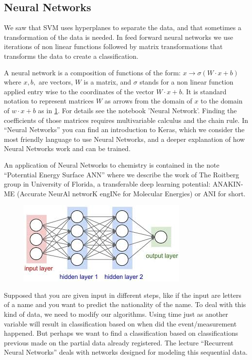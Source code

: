 \documentclass[11pt,letterpaper]{report}
\begin{document}
	\subsection{Neural Networks}  
	
	We saw that SVM uses  hyperplanes to separate the data, and that sometimes a transformation of the data is needed. In feed forward neural networks we use iterations of non linear functions followed by matrix transformations that transforms the data to create a classification.
	
	 A neural network is a composition of  functions of the form:
	$x\rightarrow \sigma(W\cdot x+b)$ where $x,b,$ are vectors, $W$ is a matrix, and $\sigma$ stands for a non linear function applied entry wise to the coordinates of the vector  $W\cdot x+b$.
	It is standard notation to represent matrices  $W$ as arrows from the domain of $x$ to the domain of $w\cdot x + b$ as in \ref{fig:nn}. For details see the notebook 'Neural Network'.
	 Finding the coefficients of those matrices requires multivariable calculus and the chain rule. In ``Neural Networks'' you can find an introduction to Keras, which we consider the most friendly language to use Neural Networks, and a deeper explanation of how Neural Networks work and can be trained.	
	
	
	An application of Neural Networks to chemistry is contained in the note ``Poterntial Energy Surface ANN'' where we describe the work of The Roitberg group in University of Florida, a transferable deep learning potential: ANAKIN-ME (Accurate NeurAl networK engINe for Molecular Energies) or ANI for short.
	
    	\begin{figure}[h!]
    	\centering
    	\includegraphics[width=0.45\linewidth]{figures/nn.jpg}
    	\caption{}
    	\label{fig:nn}
    \end{figure} 	
    
    Supposed that you are given  input in different steps, like if the input are letters of a name and you want to predict the nationality of the name. To deal with this kind of data, we need to modify our algorithms. Using time just as another variable will result in classification based on when did the event/measurement happened. But perhaps we want to find a classification based on classifications previous made on the partial data already registered. The lecture ``Recurrent Neural Networks'' deals with networks designed for modeling this sequential data.  
    
\end{document}
